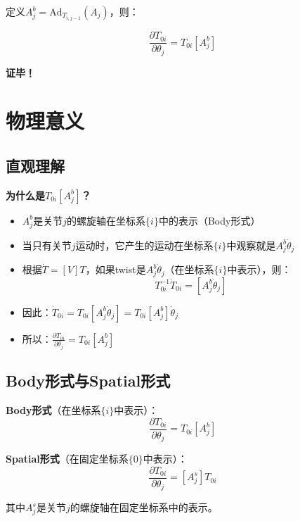 \documentclass[12pt,a4paper]{article}
\begin{document}
定义$A_j^b = \text{Ad}_{T_{i,j-1}}(A_j)$，则：

\begin{equation}
\frac{\partial T_{0i}}{\partial \theta_j} = T_{0i} [A_j^b]
\end{equation}

\textbf{证毕！}

\section{物理意义}

\subsection{直观理解}

\textbf{为什么是$T_{0i} [A_j^b]$？}

\begin{itemize}
\item $A_j^b$是关节$j$的螺旋轴在坐标系$\{i\}$中的表示（Body形式）
\item 当只有关节$j$运动时，它产生的运动在坐标系$\{i\}$中观察就是$A_j^b \dot{\theta}_j$
\item 根据$\dot{T} = [V]T$，如果twist是$A_j^b \dot{\theta}_j$（在坐标系$\{i\}$中表示），则：
\begin{equation}
T_{0i}^{-1} \dot{T}_{0i} = [A_j^b \dot{\theta}_j]
\end{equation}
\item 因此：$\dot{T}_{0i} = T_{0i} [A_j^b \dot{\theta}_j] = T_{0i} [A_j^b] \dot{\theta}_j$
\item 所以：$\frac{\partial T_{0i}}{\partial \theta_j} = T_{0i} [A_j^b]$
\end{itemize}

\subsection{Body形式与Spatial形式}

\textbf{Body形式}（在坐标系$\{i\}$中表示）：
\begin{equation}
\frac{\partial T_{0i}}{\partial \theta_j} = T_{0i} [A_j^b]
\end{equation}

\textbf{Spatial形式}（在固定坐标系$\{0\}$中表示）：
\begin{equation}
\frac{\partial T_{0i}}{\partial \theta_j} = [A_j^s] T_{0i}
\end{equation}

其中$A_j^s$是关节$j$的螺旋轴在固定坐标系中的表示。
\end{document}
